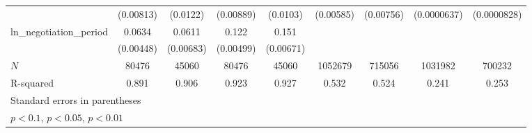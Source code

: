 {\begin{tabular}{l*{8}{c}}
            &   (0.00813)         &    (0.0122)         &   (0.00889)         &    (0.0103)         &   (0.00585)         &   (0.00756)         & (0.0000637)         & (0.0000828)         \\
\addlinespace
ln\_negotiation\_period&      0.0634\sym{***}&      0.0611\sym{***}&       0.122\sym{***}&       0.151\sym{***}&                     &                     &                     &                     \\
            &   (0.00448)         &   (0.00683)         &   (0.00499)         &   (0.00671)         &                     &                     &                     &                     \\
\midrule
\(N\)       &       80476         &       45060         &       80476         &       45060         &     1052679         &      715056         &     1031982         &      700232         \\
R-squared   &       0.891         &       0.906         &       0.923         &       0.927         &       0.532         &       0.524         &       0.241         &       0.253         \\
\bottomrule
\multicolumn{9}{l}{\footnotesize Standard errors in parentheses}\\
\multicolumn{9}{l}{\footnotesize \sym{*} \(p<0.1\), \sym{**} \(p<0.05\), \sym{***} \(p<0.01\)}\\
\end{tabular}
}
